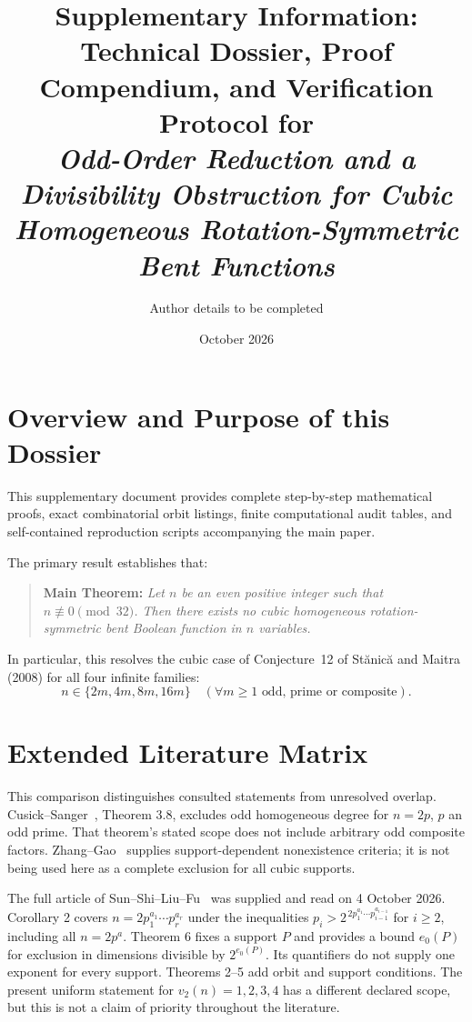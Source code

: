 \documentclass[11pt,a4paper]{article}
\title{\textbf{Supplementary Information:}\\
\Large Technical Dossier, Proof Compendium, and Verification Protocol for\\
\textit{Odd-Order Reduction and a Divisibility Obstruction for Cubic Homogeneous Rotation-Symmetric Bent Functions}}
\author{Author details to be completed}
\date{October 2026}
\theoremstyle{definition}
\begin{document}
\maketitle

\tableofcontents
\newpage

\section{Overview and Purpose of this Dossier}

This supplementary document provides complete step-by-step mathematical proofs, exact combinatorial orbit listings, finite computational audit tables, and self-contained reproduction scripts accompanying the main paper.

The primary result establishes that:
\begin{quote}
\textbf{Main Theorem:} \emph{Let $n$ be an even positive integer such that $n \not\equiv 0 \pmod{32}$. Then there exists no cubic homogeneous rotation-symmetric bent Boolean function in $n$ variables.}
\end{quote}
In particular, this resolves the cubic case of Conjecture~12 of St\u{a}nic\u{a} and Maitra (2008) for all four infinite families:
\begin{equation}
n \in \{2m, 4m, 8m, 16m\} \quad (\forall m \ge 1 \text{ odd, prime or composite}).
\end{equation}

\section{Extended Literature Matrix}

This comparison distinguishes consulted statements from unresolved overlap.
Cusick--Sanger~\cite{cusick2017}, Theorem 3.8, excludes odd homogeneous degree for $n=2p$, $p$ an odd prime. That theorem's stated scope does not include arbitrary odd composite factors. Zhang--Gao~\cite{zhang2013} supplies support-dependent nonexistence criteria; it is not being used here as a complete exclusion for all cubic supports.

The full article of Sun--Shi--Liu--Fu~\cite{sun2026} was supplied and read on 4 October 2026. Corollary 2 covers $n=2p_1^{a_1}\cdots p_r^{a_r}$ under the inequalities $p_i>2^{\,2p_1^{a_1}\cdots p_{i-1}^{a_{i-1}}}$ for $i\ge2$, including all $n=2p^a$. Theorem 6 fixes a support $P$ and provides a bound $e_0(P)$ for exclusion in dimensions divisible by $2^{e_0(P)}$. Its quantifiers do not supply one exponent for every support. Theorems 2--5 add orbit and support conditions. The present uniform statement for $v_2(n)=1,2,3,4$ has a different declared scope, but this is not a claim of priority throughout the literature.
\end{document}
